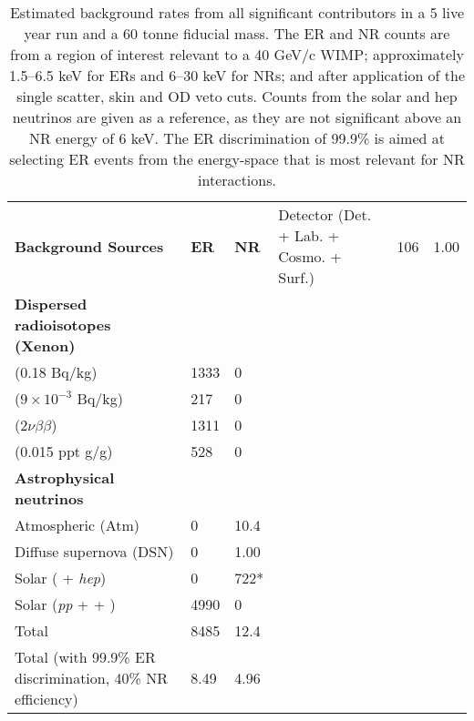\begin{table}[]
\centering
\caption{Estimated background rates from all significant contributors in a 5 live year run and a 60 tonne fiducial mass. The ER and NR counts are from a region of interest relevant to a 40 GeV/c\squared{} WIMP; approximately 1.5--6.5 keV for ERs and 6--30 keV for NRs; and after application of the single scatter, skin and OD veto cuts. Counts from the solar \BE{} and hep neutrinos are given as a reference, as they are not significant above an NR energy of 6 keV. The ER discrimination of 99.9\% is aimed at selecting ER events from the energy-space that is most relevant for NR interactions.}
\label{tab:g3_background_count}
\vspace{1mm}
\renewcommand{\arraystretch}{1.2}
    \begin{tabularx}{1.0\linewidth}{@{\extracolsep{\fill}}lll}
    \toprule
    \textbf{Background Sources} & %
    \textbf{ER} & %
    \textbf{NR} & %
    \hline
    \hline

    Detector (Det. + Lab. + Cosmo. + Surf.)     & 106  & 1.00 \\
    \textbf{Dispersed radioisotopes (Xenon)}    &      &      \\
    \RnTTT{} (0.18 \micro{}Bq/kg)                & 1333 & 0    \\
    \RnTTZ{} ($9\times10^{-3}$ \micro{}Bq/kg)               & 217  & 0    \\
    \XeOTS{} ($2\nu\beta\beta$)                 & 1311 & 0    \\
    \KrEF{} (0.015 ppt g/g)                     & 528  & 0    \\
    \textbf{Astrophysical neutrinos}            &      &      \\
    Atmospheric (Atm)                           & 0    & 10.4 \\
    Diffuse supernova (DSN)                     & 0    & 1.00 \\
    Solar (\BE{} + \textit{hep})                & 0    & 722* \\
    Solar (\textit{pp} + \BeS{} + \NOT{})       & 4990 & 0    \\
    \hline
    Total                                                       & 8485 & 12.4 \\
    Total (with 99.9\% ER discrimination, 40\% NR efficiency)   & 8.49 & 4.96 \\
    
    \bottomrule
    \end{tabularx}
\end{table}